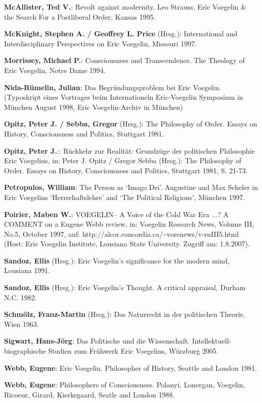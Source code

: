 {\bf McAllister, Ted V.}: Revolt against modernity. Leo Strauss, Eric Voegelin
\& the Search For a Postliberal Order, Kansas 1995.

{\bf McKnight, Stephen A. / Geoffrey L. Price} (Hrsg.): International and
Interdisciplinary Perspectives on Eric Voegelin, Missouri 1997.

{\bf Morrissey, Michael P.}: Consciousness and Transcendence. The Theology of
Eric Voegelin, Notre Dame 1994.

{\bf Nida-Rümelin, Julian}: Das Begründungsproblem bei Eric
Voegelin. (Typoskript eines Vortrages beim Internationeln Eric-Voegelin
Symposium in München August 1998, Eric Voegelin-Archiv in München)

{\bf Opitz, Peter J. / Sebba, Gregor} (Hrsg.): The Philosophy of Order. Essays
on History, Consciousness and Politics, Stuttgart 1981.

{\bf Opitz, Peter J.}:: Rückkehr zur Realität: Grundzüge der
  politischen Philosophie Eric Voegelins, in: Peter J.  Opitz /
  Gregor Sebba (Hrsg.): The Philosophy of Order. Essays on History,
  Consciousness and Politics, Stuttgart 1981, S. 21-73.

{\bf Petropulos, William}: The Person as `Imago Dei'. Augustine and Max
Scheler in Eric Voegelins `Herrschaftslehre' and `The Political Religions',
München 1997.

{\bf Poirier, Maben W.}: VOEGELIN-- A Voice of the Cold War Era ...? A COMMENT
on a Eugene Webb review, in: Voegelin Research News, Volume III, No.5, October
1997, auf: http://alcor.concordia.ca/\~{ }vorenews/v-rnIII5.html (Host:
Eric Voegelin Institute, Lousiana State University. Zugriff am: 1.8.2007).

{\bf Sandoz, Ellis} (Hrsg.): Eric Voegelin's significance for the modern
mind, Lousiana 1991.

{\bf Sandoz, Ellis} (Hrsg.): Eric Voegelin's Thought. A critical appraisal,
Durham N.C. 1982.

{\bf Schmölz, Franz-Martin} (Hrsg.): Das Naturrecht in der politischen
Theorie, Wien 1963.

{\bf Sigwart, Hans-Jörg}: Das Politische und die Wissenschaft.
Intellektuell-biographische Studien zum Frühwerk Eric Voegelins,
Würzburg 2005.

{\bf Webb, Eugene}: Eric Voegelin. Philosopher of History, Seattle and London
1981.

{\bf Webb, Eugene}: Philosophers of Consciousness. Polanyi,
  Lonergan, Voegelin, Ricoeur, Girard, Kierkegaard, Seatle and London 1988.

